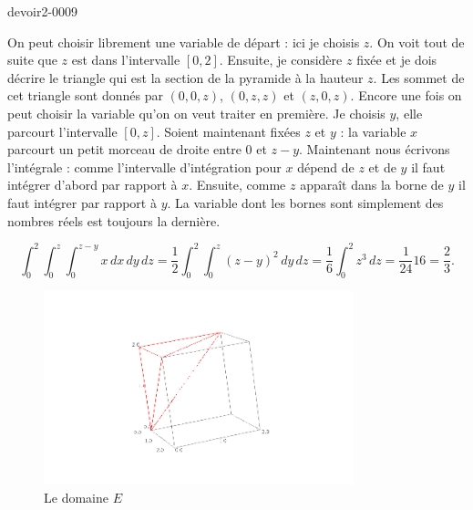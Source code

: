 \begin{corrige}{devoir2-0009}
\begin{enumerate}
On peut choisir librement  une variable de départ : ici je choisis $z$. On voit tout de suite que $z$ est dans l'intervalle $[0, 2]$. Ensuite, je considère $z$ fixée et je dois décrire le triangle qui est la section de la pyramide à la hauteur $z$. Les sommet de cet triangle sont donnés par $(0,0,z)$, $(0,z,z)$ et $(z,0,z)$. Encore une fois on peut choisir la variable qu'on on veut traiter en première. Je choisis $y$, elle parcourt l'intervalle $[0, z]$. Soient maintenant fixées $z$ et $y$ : la variable $x$ parcourt un petit morceau de droite entre $0$ et $z-y$. Maintenant nous écrivons l'intégrale : comme l'intervalle d'intégration pour $x$ dépend de $z$ et de $y$ il faut intégrer d'abord par rapport à $x$. Ensuite, comme $z$ apparaît dans la borne de $y$ il faut intégrer par rapport à $y$. La variable dont les bornes sont simplement des nombres réels est toujours la dernière.  

\begin{equation}
  \int_0^2\int_0^z\int_0^{z-y}x\, dx\,dy\,dz=\frac{1}{2}\int_0^2\int_0^z(z-y)^2\, dy \, dz = \frac{1}{6}\int_0^2 z^3 \,dz = \frac{1}{24} 16= \frac{2}{3}.
\end{equation}
  \end{enumerate}

  \begin{figure}
    \begin{center}
      \includegraphics[width=9cm]{Fig_exo8devoir2deuxieme.png}
      
      \caption{Le domaine $E$}\label{exo8devoir2deuxieme}
    \end{center}
  \end{figure}
   
\end{corrige}
